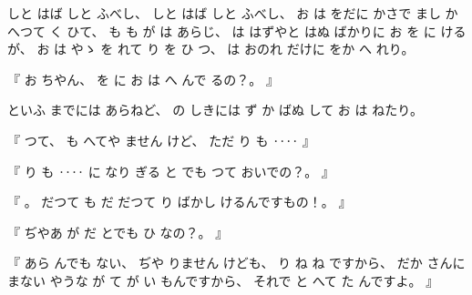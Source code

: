 
%
しと
はば
しと
ふべし、
%
しと
はば
しと
ふべし、
%
お
は
をだに
かさで
まし
かへつて
く
ひて、
%
も
も%
が
は
あらじ、
%
は
はずやと
はぬ
ばかりに
お
を
に
けるが、
%
お
は
やゝ
を
れて
り
を
ひ
つ、
%
は
おのれ
だけに
をか
へ
れり。

%
『
お
ちやん、
%
を
に
お
は
へ
んで
るの？。
』

%
といふ
までには
あらねど、
%
の
しきには
ず
か
ばぬ%
して
お
は
ねたり。

%
『
つて、
%
も
へてや
ません
けど、
%
ただ%
り
も
‥‥
』

%
『
り
も
‥‥
に
なり
ぎる
と
でも
つて
おいでの？。
』

%
『
。
%
だつて
も
だ
だつて
り
ばかし
けるんですもの！。
』

%
『
ぢやあ
が
だ
とでも
ひ
なの？。
』

%
『
あら
んでも
ない、
%
ぢや
りません
けども、
%
り
ね
ね%
ですから、
%
だか
さんに
まない
やうな
が
て
が
い
もんですから、
%
それで
と
へて
た
んですよ。
』


